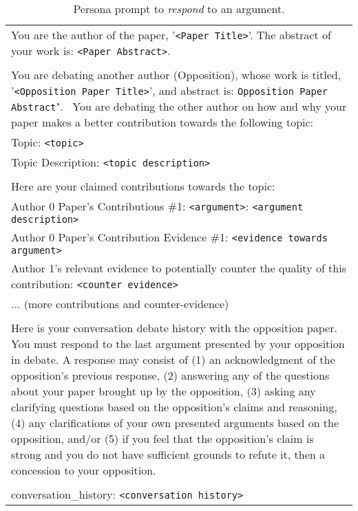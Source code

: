 \begin{table*}[h]
\centering
\begin{tabularx}{\textwidth}{|X|}
\hline
You are the author of the paper, '\texttt{<Paper Title>}'. The abstract of your work is: \texttt{<Paper Abstract>}.
\\\\
You are debating another author (Opposition), whose work is titled, '\texttt{<Opposition Paper Title>}', and abstract is: \texttt{Opposition Paper Abstract}".
\
You are debating the other author on how and why your paper makes a better contribution towards the following topic: \\
Topic: \texttt{<topic>} \\
Topic Description: \texttt{<topic description>}
\\\\
Here are your claimed contributions towards the topic: \\
Author 0 Paper's Contributions \#1: \texttt{<argument>}: \texttt{<argument description>} \\
Author 0 Paper's Contribution Evidence \#1: \texttt{<evidence towards argument>} \\
Author 1's relevant evidence to potentially counter the quality of this contribution: \texttt{<counter evidence>} \\
... (more contributions and counter-evidence)
\\\\
Here is your conversation debate history with the opposition paper. You must respond to the last argument presented by your opposition in debate. A response may consist of (1) an acknowledgment of the opposition's previous response, (2) answering any of the questions about your paper brought up by the opposition, (3) asking any clarifying questions based on the opposition's claims and reasoning, (4) any clarifications of your own presented arguments based on the opposition, and/or (5) if you feel that the opposition's claim is strong and you do not have sufficient grounds to refute it, then a concession to your opposition.
\\\\
conversation\_history: \texttt{<conversation history>}
 \\ \hline
\end{tabularx}
\caption{Persona prompt to \textit{respond} to an argument.}
\label{prompt_persona: respond_to_argument}
\end{table*}


